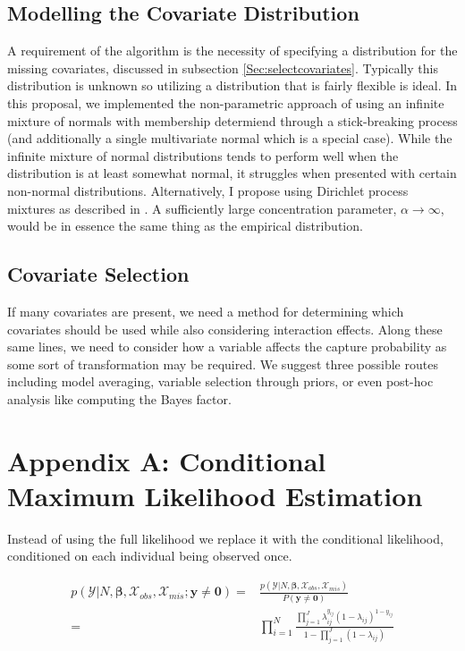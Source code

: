 \documentclass[
  12pt,
]{article}
\begin{document}
\subsection{Modelling the Covariate Distribution}

A requirement of the algorithm is the necessity of specifying a
distribution for the missing covariates, discussed in subsection
\ref{Sec:selectcovariates}. Typically this distribution is unknown so
utilizing a distribution that is fairly flexible is ideal. In this
proposal, we implemented the non-parametric approach of using an
infinite mixture of normals with membership determiend through a
stick-breaking process (and additionally a single multivariate normal
which is a special case). While the infinite mixture of normal
distributions tends to perform well when the distribution is at least
somewhat normal, it struggles when presented with certain non-normal
distributions. Alternatively, I propose using Dirichlet process mixtures
as described in \cite{gelman_bayesian_2014}. A sufficiently large
concentration parameter, \(\alpha \rightarrow \infty\), would be in
essence the same thing as the empirical distribution.

\subsection{Covariate Selection}

If many covariates are present, we need a method for determining which
covariates should be used while also considering interaction effects.
Along these same lines, we need to consider how a variable affects the
capture probability as some sort of transformation may be required. We
suggest three possible routes including model averaging, variable
selection through priors, or even post-hoc analysis like computing the
Bayes factor.

\newpage

\section{Appendix A: Conditional Maximum Likelihood Estimation}

\label{Sec:conditionalmaximumlike}

Instead of using the full likelihood we replace it with the conditional
likelihood, conditioned on each individual being observed once.

\begin{align}
\nonumber p(\mathcal{Y}|N,\boldsymbol{\beta},\mathcal{X}_{obs},\mathcal{X}_{mis};\boldsymbol{y}\ne \boldsymbol{0}) = & \frac{p(\mathcal{Y}|N,\boldsymbol{\beta},\mathcal{X}_{obs},\mathcal{X}_{mis})}{P(\boldsymbol{y}\ne \boldsymbol{0})} \\
= & \prod_{i=1}^N \frac{\prod_{j=1}^J \lambda_{ij}^{y_{ij}}(1-\lambda_{ij})^{1-y_{ij}}}{1-\prod_{j=1}^J(1-\lambda_{ij})}
\end{align}
\end{document}
